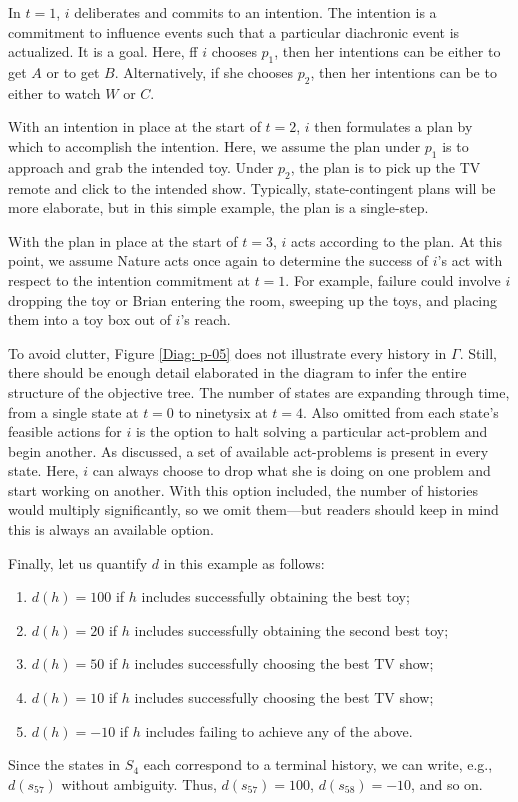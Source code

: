 \documentclass[
11pt,
titlepage,
reqno,
]{article}%
\theoremstyle{definition}
\begin{document}
{In $t=1$, $i$ deliberates and commits to an intention. 
The intention is a commitment to influence events such that a particular diachronic event is actualized.
It is a goal. 
Here, ff $i$ chooses $p_1$, then her intentions can be either to get $A$ or to get $B$.
Alternatively, if she chooses $p_2$, then her intentions can be to either to watch $W$ or  $C$.

With an intention in place at the start of $t=2$, $i$ then formulates a plan by which to accomplish the intention. 
Here, we assume the plan under $p_1$ is to approach and grab the intended toy. 
Under  $p_2$, the plan is to pick up the TV remote and click to the intended show.
Typically, state-contingent plans will be more elaborate, but in this simple example, the plan is a single-step.

With the plan in place at the start of $t=3$, $i$ acts according to the plan.
At this point, we assume Nature acts once again to determine the success of $i$'s act with respect to the intention commitment at $t=1$.
For example, failure could involve $i$ dropping the toy or Brian entering the room, sweeping up the toys, and placing them into a toy box out of $i$'s reach.

To avoid clutter, Figure \ref{Diag: p-05} does not illustrate every history in $\Gamma$.
Still, there should be enough detail elaborated in the diagram to infer the entire structure of the objective tree.
The number of states are expanding through time, from a single state at $t=0$ to ninetysix at $t=4$.
Also omitted from each state's feasible actions for $i$ is the option to halt solving a particular act-problem and begin another.
As discussed, a set of available act-problems is present in every state.
Here, $i$ can always choose to drop what she is doing on one problem and start working on another.
With this option included, the number of histories would multiply significantly, so we omit them---but readers should keep in mind this is always an available option.

Finally, let us quantify $d$ in this example as follows:
\begin{enumerate}
	\item $d(h)=100$ if $h$ includes successfully obtaining the best toy;
	\item $d(h)=20$ if $h$ includes successfully obtaining the second best toy;
	\item $d(h)=50$ if $h$ includes successfully choosing the best TV show;
	\item $d(h)=10$ if $h$ includes successfully choosing the best TV show;
	\item $d(h)=-10$ if $h$ includes failing to achieve any of the above.
\end{enumerate}
Since the states in $S_4$ each correspond to a terminal history, we can write, e.g., $d(s_{57})$ without ambiguity.
Thus, $d(s_{57})=100$, $d(s_{58})=-10$,   and so on.
}
\end{document}
